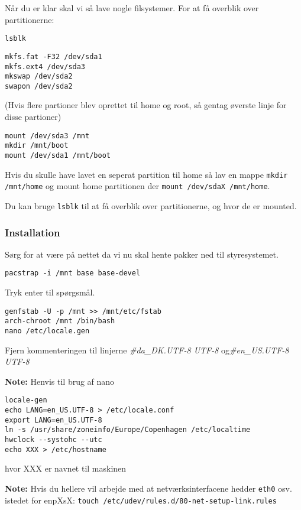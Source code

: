 \documentclass[10pt,a4paper,danish]{article}
\newcommand{\note}[1]{\begin{mdframed}[style=note]\textbf{Note:}
    #1\end{mdframed}}
\newcommand{\code}[1]{\colorbox{verbgray}{\texttt{#1}}}
\begin{document}
Når du er klar skal vi så lave nogle filsystemer.
For at få overblik over partitionerne:
\begin{verbatim}
lsblk
\end{verbatim}

\begin{verbatim}
mkfs.fat -F32 /dev/sda1
mkfs.ext4 /dev/sda3
mkswap /dev/sda2
swapon /dev/sda2
\end{verbatim}
(Hvis flere partioner blev oprettet til home og root, så gentag øverste linje
for disse partioner)

\begin{verbatim}
mount /dev/sda3 /mnt
mkdir /mnt/boot
mount /dev/sda1 /mnt/boot
\end{verbatim}

Hvis du skulle have lavet en seperat partition til home så lav en mappe
\code{mkdir /mnt/home} og mount home partitionen der \code{mount /dev/sdaX
  /mnt/home}.

Du kan bruge \code{lsblk} til at få overblik over partitionerne, og hvor
de er mounted.
\newpage
\subsubsection{Installation}
Sørg for at være på nettet da vi nu skal hente pakker ned til styresystemet.
\begin{verbatim}
pacstrap -i /mnt base base-devel
\end{verbatim}
Tryk enter til spørgsmål.

\begin{verbatim}
genfstab -U -p /mnt >> /mnt/etc/fstab
arch-chroot /mnt /bin/bash
nano /etc/locale.gen
\end{verbatim}

Fjern kommenteringen til linjerne \textit{\#da\_DK.UTF-8 UTF-8} og\textit{\#en\_US.UTF-8 UTF-8}
\note{Henvis til brug af nano}

\begin{verbatim}
locale-gen
echo LANG=en_US.UTF-8 > /etc/locale.conf
export LANG=en_US.UTF-8
ln -s /usr/share/zoneinfo/Europe/Copenhagen /etc/localtime
hwclock --systohc --utc
echo XXX > /etc/hostname
\end{verbatim}
hvor XXX er navnet til maskinen

\note{Hvis du hellere vil arbejde med at netværksinterfacene hedder
  \texttt{eth0} osv. istedet for enpXsX:
  \code{touch /etc/udev/rules.d/80-net-setup-link.rules}}
\end{document}

